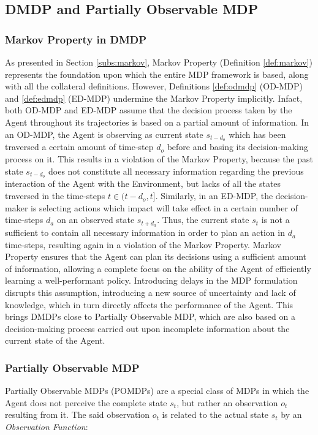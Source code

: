         \subsection{DMDP and Partially Observable MDP}
            \subsubsection{Markov Property in DMDP}
                \label{subs:markovmdp}
                As presented in Section \ref{subs:markov}, Markov Property (Definition \ref{def:markov}) represents the foundation upon which the entire MDP framework is based, along with all the collateral definitions. However, 
                Definitions \ref{def:odmdp} (OD-MDP) and \ref{def:edmdp} (ED-MDP) undermine the Markov Property implicitly. Infact, both OD-MDP and ED-MDP assume that the decision process taken by the Agent throughout its trajectories is based on a partial amount of information. \newline
                In an OD-MDP, the Agent is observing as current state $s_{t-d_{o}}$ which has been traversed a certain amount of time-step $d_o$ before and basing its decision-making process on it. This results in a violation of the Markov Property, because the past state $s_{t-d_{o}}$ does not constitute all necessary information regarding the previous interaction of the Agent with the Environment, but lacks of all the states traversed in the time-steps $t \in (t-d_{o}, t]$. Similarly, in an ED-MDP, the decision-maker is selecting actions which impact will take effect in a certain number of time-steps $d_a$ on an observed state $s_{t+d_{a}}$. Thus, the current state $s_t$ is not a sufficient to contain all necessary information in order to plan an action in $d_{a}$ time-steps, resulting again in a violation of the Markov Property. \newline
                Markov Property ensures that the Agent can plan its decisions using a sufficient amount of information, allowing a complete focus on the ability of the Agent of efficiently learning a well-performant policy. Introducing delays in the MDP formulation disrupts this assumption, introducing a new source of uncertainty and lack of knowledge, which in turn directly affects the performance of the Agent. This brings DMDPs close to Partially Observable MDP, which are also based on a decision-making process carried out upon incomplete information about the current state of the Agent.
        
            \subsubsection{Partially Observable MDP}
                \label{subs:pomdp}
                Partially Observable MDPs (POMDPs) are a special class of MDPs in which the Agent does not perceive the complete state $s_t$, but rather an observation $o_t$ resulting from it. The said observation $o_t$ is related to the actual state $s_t$ by an \textit{Observation Function}:
                
